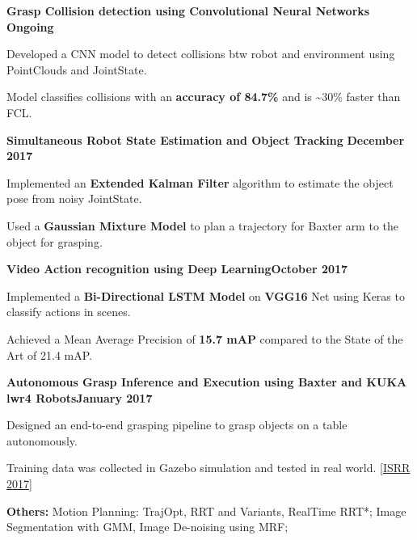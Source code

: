 \documentclass[letterpaper, margin, line, 10.5pt]{resume}
\begin{document}
\begin{resume}
	\textbf{Grasp Collision detection using Convolutional Neural Networks} \hfill \textbf{Ongoing}
	\begin{list2}
		\item Developed a CNN model to detect collisions btw robot and environment using PointClouds and JointState.
		\item Model classifies collisions with an \textbf{accuracy of 84.7\%} and is \textasciitilde 30\% faster than FCL.
	\end{list2}\vspace{-3.2mm}
	
	\textbf{Simultaneous Robot State Estimation and Object Tracking} \hfill \textbf{December 2017}
	\begin{list2}
		\item Implemented an \textbf{Extended Kalman Filter} algorithm to estimate the object pose from noisy JointState.
		\item Used a \textbf{Gaussian Mixture Model} to plan a trajectory for Baxter arm to the object for grasping.
	\end{list2}\vspace{-3.2mm}

	\textbf{Video Action recognition using Deep Learning}\hfill \textbf{October 2017}
	\begin{list2}
	\item Implemented a \textbf{Bi-Directional LSTM Model} on \textbf{VGG16} Net using Keras to classify actions in scenes.
	\item Achieved a Mean Average Precision of \textbf{15.7 mAP} compared to the State of the Art of 21.4 mAP.
	\end{list2}\vspace{-3.2mm}

	\textbf{Autonomous Grasp Inference and Execution using Baxter and KUKA lwr4 Robots}\hfill \textbf{January 2017}
	\begin{list2}
		\item Designed an end-to-end grasping pipeline to grasp objects on a table autonomously.
		\item Training data was collected in Gazebo simulation and tested in real world. [\href{https://robot-learning.cs.utah.edu/project/grasp\_inference}{ISRR 2017}]
	\end{list2}\vspace{-3.2mm}

	\textbf{Others:} Motion Planning: TrajOpt, RRT and Variants, RealTime RRT*; Image Segmentation with GMM, Image De-noising using MRF; 
	


\end{resume}
\end{document}
